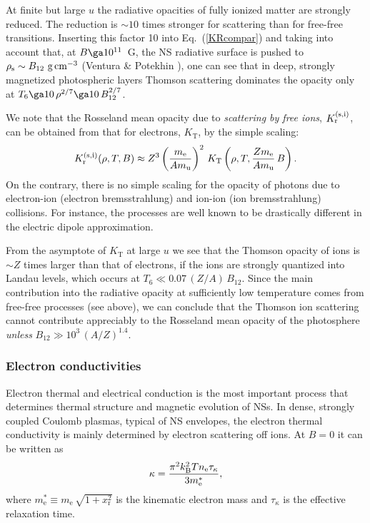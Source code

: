 \documentclass{aa}
\begin{document}
At finite but large $u$
the radiative opacities of fully ionized matter 
are strongly reduced.
The reduction is $\sim10$ times
stronger for scattering than for free-free transitions.
Inserting this factor 10 into Eq.~(\ref{KRcompar})
and taking into account that,
at $B\ga10^{11}$~G, the NS radiative surface
is pushed to $\rho_\mathrm{s} \sim B_{12}\mbox{~g\,cm$^{-3}$}$
(Ventura \& Potekhin \cite{elounda}),
one can see that in deep, strongly magnetized photospheric layers
Thomson scattering dominates the opacity only
at $T_6\ga10\,\rho^{2/7} \ga 10\,B_{12}^{2/7}$.

We note that the Rosseland
mean opacity due to \emph{scattering by free ions}, 
$K_\mathrm{r}^{\rm(s,i)}$,
can be obtained from that for electrons,  $K_\mathrm{T}$,
by the simple scaling:
%
\begin{equation}
   K_\mathrm{r}^{\rm(s,i)}(\rho,T,B) \approx Z^3
          \left({m_\mathrm{e}\over A m_\mathrm{u}}\right)^2
          \,K_\mathrm{T}\left(\rho,T,{Zm_\mathrm{e}\over A m_\mathrm{u}}\,B\right).
\label{Kion}
\end{equation}
%
On the contrary, there is no simple scaling
for the opacity of photons due to electron-ion
(electron bremsstrahlung) and ion-ion (ion bremsstrahlung) collisions.
For instance, the processes are well known to
be drastically different in the electric dipole approximation.

{}From the asymptote of $K_\mathrm{T}$ at large $u$ we see that
the Thomson opacity of ions
is $\sim Z$ times larger than that of electrons,
if the ions are strongly quantized into Landau levels,
which occurs at $T_6 \ll 0.07\,(Z/A)\,B_{12}$.
Since the main contribution into the radiative opacity
at sufficiently low temperature 
comes from free-free processes (see above),
we can conclude that 
the Thomson ion scattering cannot contribute appreciably
to the Rosseland mean opacity of the photosphere
{\em unless\/} $B_{12}\gg10^3\,(A/Z)^{1.4}$.

\subsubsection{Electron conductivities}
\label{sect-el-cond}
%
Electron thermal and electrical
conduction is the most important process
that determines thermal structure  
and magnetic evolution of NSs.
In dense, strongly coupled Coulomb plasmas, 
typical of NS envelopes, 
the electron thermal conductivity is mainly determined by
electron scattering off ions. At $B=0$
it can be written as
%
\begin{equation}
   \kappa  =  { \pi^2 k_\mathrm{B}^2 T n_\mathrm{e}  \tau_\kappa
                 \over 3 m_\mathrm{e}^\ast},
\label{dg-kin-coeff}
\end{equation} 
%
where $m_\mathrm{e}^\ast \equiv m_\mathrm{e} \, \sqrt{1+x_\mathrm{r}^2}$
is the kinematic electron mass
and $\tau_\kappa$ is the effective relaxation time.
\end{document}
